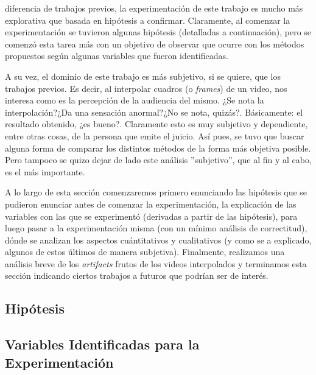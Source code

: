  diferencia de trabajos previos, la experimentaci\'on de este
trabajo es mucho m\'as explorativa que basada en hip\'otesis a confirmar.
Claramente, al comenzar la experimentaci\'on se tuvieron algunas hip\'otesis
(detalladas a continuaci\'on), pero se comenz\'o esta tarea m\'as con un
objetivo de observar que ocurre con los m\'etodos propuestos seg\'un algunas
variables que fueron identificadas.

\par A su vez, el dominio de este trabajo es m\'as subjetivo, si se quiere, que
los trabajos previos. Es decir, al interpolar cuadros (o \emph{frames}) de un
video, nos interesa como es la percepci\'on de la audiencia del mismo. ¿Se nota
la interpolaci\'on?¿Da una sensaci\'on anormal?¿No se nota, quiz\'as?.
B\'asicamente: el resultado obtenido, ¿es bueno?. Claramente esto es muy
subjetivo y dependiente, entre otras cosas, de la persona que emite el juicio.
As\'i pues, se tuvo que buscar alguna forma de comparar los distintos m\'etodos
de la forma m\'as objetiva posible. Pero tampoco se quizo dejar de lado este
an\'alisis ''subjetivo'', que al fin y al cabo, es el m\'as importante.

\par A lo largo de esta secci\'on comenzaremos primero enunciando las
hip\'otesis que se pudieron enunciar antes de comenzar la experimentaci\'on, la
explicaci\'on de las variables con las que se experiment\'o (derivadas a partir
de las hip\'otesis), para luego pasar a la experimentaci\'on misma (con un
m\'inimo an\'alisis de correctitud), d\'onde se analizan los aspectos
cu\'antitativos y cualitativos (y como se a explicado, algunos de estos
\'ultimos de manera subjetiva).  Finalmente, realizamos una an\'alisis breve de
los \emph{artifacts} frutos de los videos interpolados y terminamos esta
secci\'on indicando ciertos trabajos a futuros que podr\'ian ser de inter\'es.

\subsection{Hip\'otesis}


\subsection{Variables Identificadas para la Experimentaci\'on}


